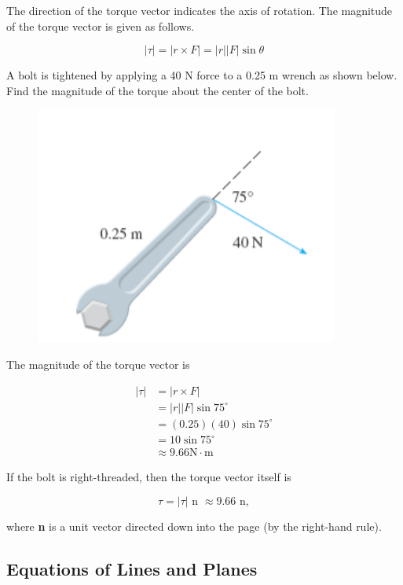         The direction of the torque vector indicates the axis of rotation. The magnitude of the torque vector is given as follows.

        \[
            |\tau| = |r \times F| = |r||F|\sin{\theta}
        \]

        \textit{} A bolt is tightened by applying a 40 N force to a 0.25 m wrench as shown below. Find the magnitude of the torque about the center of the bolt.

        \begin{figure}[hbt!]
            \centering
            \includegraphics[]{Resources/12.4_Torque}
        \end{figure}

        The magnitude of the torque vector is

        \begin{align*}
            |\tau|  &= |r \times F| \\
                    &= |r||F|\sin{75^{\circ}} \\
                    &= (0.25)(40)\sin{75^{\circ}} \\
                    &= 10\sin{75^{\circ}} \\
                    &\approx 9.66 \text{N}\cdot\text{m}
        \end{align*}

        If the bolt is right-threaded, then the torque vector itself is

        \[
            \tau = |\tau| \text{ n } \approx 9.66\text{ n},
        \]

        where \textbf{n} is a unit vector directed down into the page (by the right-hand rule).

    \subsection{Equations of Lines and Planes}      %


